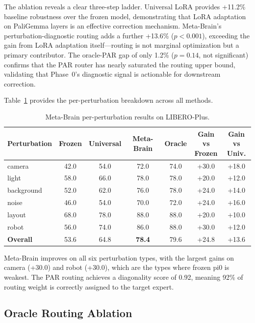 \documentclass[conference]{article}
\newcommand{\ours}{Meta-Brain}
\newcommand{\liberoplus}{LIBERO-Plus}
\begin{document}
The ablation reveals a clear three-step ladder.
Universal LoRA provides +11.2\% baseline robustness over the frozen model, demonstrating that LoRA adaptation on PaliGemma layers is an effective correction mechanism.
\ours{}'s perturbation-diagnostic routing adds a further +13.6\% ($p<0.001$), exceeding the gain from LoRA adaptation itself---routing is not marginal optimization but a primary contributor.
The oracle-PAR gap of only 1.2\% ($p=0.14$, not significant) confirms that the PAR router has nearly saturated the routing upper bound, validating that Phase~0's diagnostic signal is actionable for downstream correction.

Table~\ref{tab:per_perturb} provides the per-perturbation breakdown across all methods.

\begin{table}[h]
\centering
\caption{\ours{} per-perturbation results on \liberoplus{}.}
\label{tab:per_perturb}
\small
\begin{tabular}{lcccccc}
\toprule
Perturbation & Frozen & Universal & \ours{} & Oracle & \makecell{Gain vs\\Frozen} & \makecell{Gain vs\\Univ.} \\
\midrule
camera & 42.0 & 54.0 & 72.0 & 74.0 & +30.0 & +18.0 \\
light & 58.0 & 66.0 & 78.0 & 78.0 & +20.0 & +12.0 \\
background & 52.0 & 62.0 & 76.0 & 78.0 & +24.0 & +14.0 \\
noise & 46.0 & 54.0 & 70.0 & 72.0 & +24.0 & +16.0 \\
layout & 68.0 & 78.0 & 88.0 & 88.0 & +20.0 & +10.0 \\
robot & 56.0 & 74.0 & 86.0 & 88.0 & +30.0 & +12.0 \\
\midrule
\textbf{Overall} & 53.6 & 64.8 & \textbf{78.4} & 79.6 & +24.8 & +13.6 \\
\bottomrule
\end{tabular}
\end{table}

\ours{} improves on all six perturbation types, with the largest gains on camera (+30.0) and robot (+30.0), which are the types where frozen pi0 is weakest.
The PAR routing achieves a diagonality score of 0.92, meaning 92\% of routing weight is correctly assigned to the target expert.

\subsection{Oracle Routing Ablation}
\label{sec:oracle}
\end{document}
